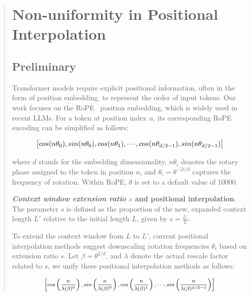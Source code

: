 \begin{abstract}
\section{Non-uniformity in Positional Interpolation}
\label{sec:analysis}

\subsection{Preliminary}

Transformer models require explicit positional information, often in the form of position embedding, to represent the order of input tokens. Our work focuses on the RoPE~\cite{rope} position embedding, which is widely used in recent  LLMs. For a token at position index $n$, its corresponding RoPE encoding can be simplified as follows:

\begin{equation}
		\fontsize{7.8}{7.8} \selectfont
	\label{eq:rope}
	\left[ cos(n\theta_0), sin(n\theta_0), cos(n\theta_1), \cdot\cdot\cdot, cos(n\theta_{d/2-1}), sin(n\theta_{d/2-1}) \right]   
\end{equation}

where $d$ stands for the embedding dimensionality, $n\theta_i$ denotes the rotary phase assigned to the token in position $n$, and $\theta_i=\theta^{-2i/d}$ captures the frequency of rotation. Within RoPE, $\theta$ is set to a default value of 10000.

\textbf{\emph{Context window extension ratio $s$} and positional interpolation}. The parameter $s$ is defined as the proportion of the new, expanded context length $L'$ relative to the initial length $L$, given by $s=\frac{L'}{L}$.

To extend the context window from $L$ to $L'$, current positional interpolation methods suggest downscaling rotation frequencies $\theta_i$ based on extension ratio $s$. Let $\beta=\theta^{2/d}$, and $\lambda$ denote the actual rescale factor related to $s$, we   unify these positional interpolation methods as follows:

\begin{equation}	
	\fontsize{7.5}{7.5} \selectfont
	\label{eq:unified_rope}
	\begin{aligned}
		\left[cos\left(\frac{n}{\lambda(\beta)^0}\right), sin \left(\frac{n}{\lambda(\beta)^0}\right), cos\left(\frac{n}{\lambda(\beta)^1}\right), \cdot\cdot\cdot,  sin \left(\frac{n}{\lambda(\beta)^{d/2-1}}\right) \right]   
	\end{aligned}
\end{equation}


\end{abstract}
